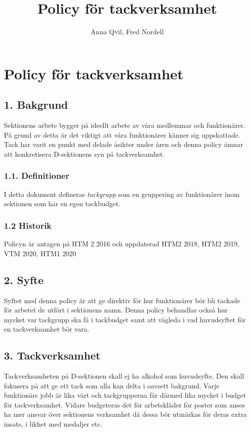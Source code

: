 \documentclass{dsekkallelse}
\title{Policy för tackverksamhet}
\author{Anna Qvil, Fred Nordell}
\begin{document}
\section{Policy för tackverksamhet}

\subsection{1. Bakgrund}
Sektionens arbete bygger på ideellt arbete av våra medlemmar och funktionärer. På grund av detta är det viktigt att våra funktionärer känner sig uppskattade. Tack har varit en punkt med delade åsikter under åren och denna policy ämnar att konkretisera D-sektionens syn på tackverksamhet.

\subsubsection{1.1. Definitioner}
I detta dokument defineras \textit{tackgrupp} som en gruppering
av funktionärer inom sektionen som har en egen tackbudget.

\subsubsection{1.2 Historik}
Policyn är antagen på HTM 2 2016 och uppdaterad HTM2 2018, HTM2 2019, VTM 2020, HTM1 2020

\subsection{2. Syfte}
Syftet med denna policy är att ge direktiv för hur funktionärer bör  bli tackade för arbetet de utfört i sektionens namn. Denna policy behandlar också hur mycket var tackgrupp ska få i tackbudget samt att vägleda i vad huvudsyftet för en tackverksamhet bör vara.
\subsection{3. Tackverksamhet}
Tackverksamheten på D-sektionen skall ej ha alkohol som huvudsyfte. Den skall fokusera på att ge ett tack som alla kan delta i oavsett bakgrund. Varje funktionärs jobb är lika värt och tackgrupperna får därmed lika mycket i budget för tackverksamhet. Vidare budgeteras det för arbetskläder för poster som anses ha mer ansvar över sektionens verksamhet då dessa bör utmärkas för deras extra insats, i likhet med medaljer etc.
\end{document}
